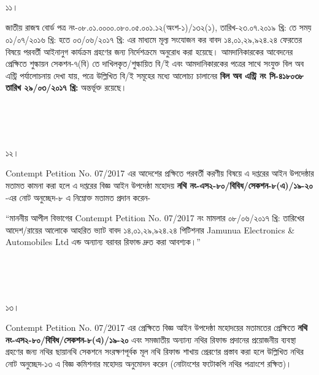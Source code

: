\documentclass[12pt]{article}
\begin{document}
\\
\\
\\
\begin{minipage}[t]{0.05\linewidth}
১১।
\end{minipage}
\begin{minipage}[t]{1\linewidth}
জাতীয় রাজস্ব বোর্ড পত্র
নং-০৮.০১.০০০০.০৮০.০৫.০০১.১২(অংশ-১)/১৩২(১),
তারিখ-২৩.০৭.২০১৯ খ্রি:
তে সময়
০১/০৭/২০১৬ খ্রি: হতে ০৩/০৬/২০১৭ খ্রি:
এর মাধ্যমে মূল্য সংযোজন কর বাবদ
১৪,০১,২৯,৯২৪.২৪
ফেরতের বিষয়ে পরবর্তী
আইনানুগ কার্যক্রম গ্রহণের জন্য
নির্দেশক্রমে অনুরোধ করা হয়েছে।
আমদানিকারকের আবেদনের প্রেক্ষিতে শুল্কায়ন
সেকশন-৭(বি) তে দাখিলকৃত/শুল্কায়িত
বি/ই এবং আমদানিকারকের
পত্রের সাথে সংযুক্ত বিল অব এন্ট্রি
পর্যালোচনায় দেখা যায়,
পত্রে উল্লিখিত বি/ই সমূহের
মধ্যে আলোচ্য চালানের
\textbf{বিল অব এন্ট্রি নং সি-৪১৮০৩৮ তারিখ ২৯/০৩/২০১৭ খ্রি:}
অন্তর্ভূক্ত রয়েছে।
\end{minipage}
\\
\\
\\
\begin{minipage}[t]{0.05\linewidth}
১২।
\end{minipage}
\begin{minipage}[t]{1\linewidth}
Contempt Petition No. 07/2017
এর আদেশের প্রক্ষিতে পরবর্তী
করণীয় বিষয়ে এ দপ্তরের আইন
উপদেষ্ঠার মতামত কামনা করা হলে এ দপ্তরের
বিজ্ঞ আইন উপদেষ্ঠা মহোদয়
\textbf{নথি নং-এস২-৮০/বিবিধ/সেকশন-৮(এ)/১৯-২০}
-এর নোট অনুচ্ছেদ-৮ এ নিম্নোক্ত মতামত প্রদান করেন-


\hspace{1em}``মাননীয় আপীল বিভাগের
Contempt Petition No. 07/2017
নং মামলার ০৮/০৬/২০১৭ খ্রি: তারিখের
আদেশ/রায়ের আলোকে আহরিত ভ্যাট বাবদ
১৪,০১,২৯,৯২৪.২৪
পিটিশনার
Jamunua Electronics \& Automobiles Ltd
এন্ড অন্যান্য বরাবর রিফান্ড
দ্রুত করা আবশ্যক।''
\end{minipage}
\\
\\
\\
\begin{minipage}[t]{0.05\linewidth}
১৩।
\end{minipage}
\begin{minipage}[t]{1\linewidth}
Contempt Petition No. 07/2017
এর প্রেক্ষিতে বিজ্ঞ আইন উপদেষ্ঠা মহোদয়ের
মতামতের প্রেক্ষিতে
\textbf{নথি নং-এস২-৮০/বিবিধ/সেকশন-৮(এ)/১৯-২০}
এবং সমজাতীয় অন্যান্য নথির
রিফান্ড প্রদানের প্রয়োজনীয় ব্যবস্থা গ্রহণের
জন্য নথির ছায়ানথি সেকশনে
সংরক্ষণপূর্বক মূল নথি রিফান্ড
শাখায় প্রেরণের প্রস্তাব করা হলে উল্লিখিত নথির
নোট অনুচ্ছেদ-১৩ এ বিজ্ঞ কমিশনার মহোদয় অনুমোদন
করেন (নোটাংশের ফটোকপি নথির পত্রাংশে রক্ষিত)।
\end{minipage}
\end{document}
